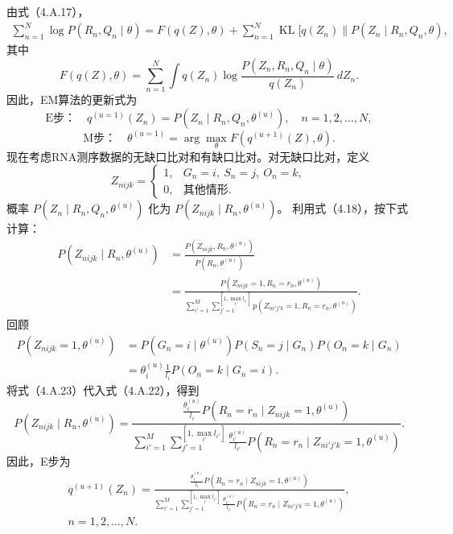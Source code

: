 由式（4.A.17），
\begin{equation}
\begin{aligned}
\sum_{n=1}^{N}\log P(R_n,Q_n\mid\theta)
=F(q(Z),\theta)+\sum_{n=1}^{N}\operatorname{KL}[q(Z_n)\|P(Z_n\mid R_n,Q_n,\theta),
\end{aligned}\tag{4.A.19}
\end{equation}
其中
\[
F(q(Z),\theta)=\sum_{n=1}^{N}\int q(Z_n)
\log\frac{P(Z_n,R_n,Q_n\mid\theta)}{q(Z_n)}\,dZ_n.
\]
因此，EM算法的更新式为
\begin{equation}
\text{E步：}\quad q^{(u=1)}(Z_n)=P(Z_n\mid R_n,Q_n,\theta^{(u)}),
\quad n=1,2,\ldots,N,\tag{4.A.20}
\end{equation}
\begin{equation}
\text{M步：}\quad\theta^{(u=1)}=\arg\max_\theta F(q^{(u+1)}(Z),\theta).\tag{4.A.21}
\end{equation}
现在考虑RNA测序数据的无缺口比对和有缺口比对。对无缺口比对，定义
\[
Z_{nijk}=\begin{cases}
1,&G_n=i,\ S_n=j,\ O_n=k,\\0,&\text{其他情形}.
\end{cases}
\]
概率 $P(Z_n\mid R_n,Q_n,\theta^{(u)})$ 化为 $P(Z_{nijk}\mid R_n,\theta^{(u)})$。
利用式（4.18），按下式计算：
\begin{equation}
\begin{aligned}
P(Z_{nijk}\mid R_n,\theta^{(u)})
&=\frac{P(Z_{nijk},R_n,\theta^{(u)})}{P(R_n,\theta^{(u)})}\\
&=\frac{P(Z_{nijk}=1,R_n=r_n,\theta^{(u)})}{
\displaystyle\sum_{i'=1}^{M}\sum_{j'=1}^{[1,\max_{i'}l_{i'}]}
p(Z_{ni'j'k}=1,R_n=r_n,\theta^{(u)})}.
\end{aligned}\tag{4.A.22}
\end{equation}
回顾
\begin{equation}
\begin{aligned}
P(Z_{nijk}=1,\theta^{(u)})
&=P(G_n=i\mid\theta^{(u)})P(S_n=j\mid G_n)P(O_n=k\mid G_n)\\
&=\theta_i^{(u)}\frac1{l_i}P(O_n=k\mid G_n=i).
\end{aligned}\tag{4.A.23}
\end{equation}
将式（4.A.23）代入式（4.A.22），得到
\[
P(Z_{nijk}\mid R_n,\theta^{(u)})=
\frac{\displaystyle\frac{\theta_i^{(u)}}{l_i}
P(R_n=r_n\mid Z_{nijk}=1,\theta^{(u)})}{
\displaystyle\sum_{i'=1}^{M}\sum_{j'=1}^{[1,\max_{i'}l_{i'}]}
\frac{\theta_{i'}^{(u)}}{l_{i'}}P(R_n=r_n\mid Z_{ni'j'k}=1,\theta^{(u)})}.
\]
因此，E步为
\begin{equation}
\begin{aligned}
q^{(u+1)}(Z_n)=
\frac{\displaystyle\frac{\theta_i^{(u)}}{l_i}
P(R_n=r_n\mid Z_{nijk}=1,\theta^{(u)})}{
\displaystyle\sum_{i'=1}^{M}\sum_{j'=1}^{[1,\max_{i'}l_{i'}]}
\frac{\theta_{i'}^{(u)}}{l_{i'}}P(R_n=r_n\mid Z_{ni'j'k}=1,\theta^{(u)})},\\
n=1,2,\ldots,N.
\end{aligned}\tag{4.A.24}
\end{equation}
